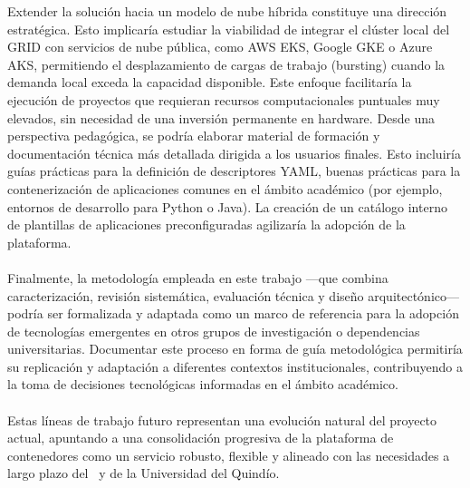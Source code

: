 \noindent
Extender la solución hacia un modelo de nube híbrida constituye una dirección estratégica. Esto implicaría estudiar la viabilidad de integrar el clúster local del GRID con servicios de nube pública, como AWS EKS, Google GKE o Azure AKS, permitiendo el desplazamiento de cargas de trabajo (bursting) cuando la demanda local exceda la capacidad disponible. Este enfoque facilitaría la ejecución de proyectos que requieran recursos computacionales puntuales muy elevados, sin necesidad de una inversión permanente en hardware.
\noindent
Desde una perspectiva pedagógica, se podría elaborar material de formación y documentación técnica más detallada dirigida a los usuarios finales. Esto incluiría guías prácticas para la definición de descriptores YAML, buenas prácticas para la contenerización de aplicaciones comunes en el ámbito académico (por ejemplo, entornos de desarrollo para Python o Java). La creación de un catálogo interno de plantillas de aplicaciones preconfiguradas agilizaría la adopción de la plataforma. \\ \\
\noindent
Finalmente, la metodología empleada en este trabajo —que combina caracterización, revisión sistemática, evaluación técnica y diseño arquitectónico— podría ser formalizada y adaptada como un marco de referencia para la adopción de tecnologías emergentes en otros grupos de investigación o dependencias universitarias. Documentar este proceso en forma de guía metodológica permitiría su replicación y adaptación a diferentes contextos institucionales, contribuyendo a la toma de decisiones tecnológicas informadas en el ámbito académico.\\ \\
\noindent
Estas líneas de trabajo futuro representan una evolución natural del proyecto actual, apuntando a una consolidación progresiva de la plataforma de contenedores como un servicio robusto, flexible y alineado con las necesidades a largo plazo del \GRID\ y de la Universidad del Quindío.